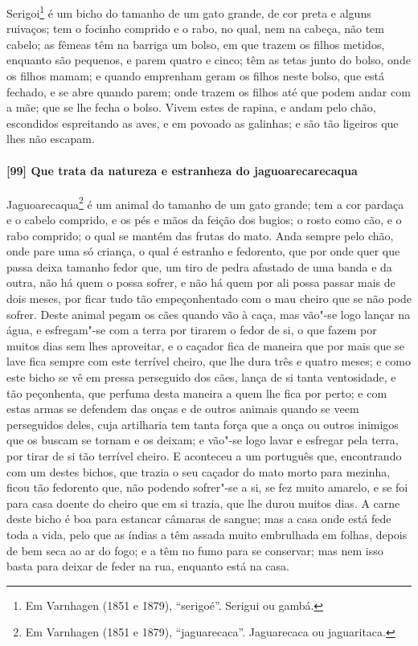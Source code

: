 Serigoi\footnote{ Em Varnhagen (1851 e 1879), ``serigoé''. Serigui ou gambá.} é um bicho
do tamanho de um gato grande, de cor preta e alguns ruivaços; tem o focinho comprido e o
rabo, no qual, nem na cabeça, não tem cabelo; as fêmeas têm na barriga um bolso, em que
trazem os filhos metidos, enquanto são pequenos, e parem quatro e cinco; têm as tetas
junto do bolso, onde os filhos mamam; e quando emprenham geram os filhos neste bolso, que
está fechado, e se abre quando parem; onde trazem os filhos até que podem andar com a mãe;
que se lhe fecha o bolso. Vivem estes de rapina, e andam pelo chão, escondidos espreitando
as aves, e em povoado as galinhas; e são tão ligeiros que lhes não escapam.

\paragraph{[99] Que trata da natureza e estranheza do jaguoarecarecaqua}\quad
Jaguoarecaqua\footnote{ Em Varnhagen (1851 e 1879), ``jaguarecaca''. Jaguarecaca ou
jaguaritaca.} é um animal do tamanho de um gato grande; tem a cor pardaça e o cabelo
comprido, e os pés e mãos da feição dos bugios; o rosto como cão, e o rabo comprido; o
qual se mantém das frutas do mato. Anda sempre pelo chão, onde pare uma só criança, o qual
é estranho e fedorento, que por onde quer que passa deixa tamanho fedor que, um tiro de
pedra afastado de uma banda e da outra, não há quem o possa sofrer, e não há quem por ali
possa passar mais de dois meses, por ficar tudo tão empeçonhentado com o mau cheiro que se
não pode sofrer. Deste animal pegam os cães quando vão à caça, mas vão"-se logo lançar na
água, e esfregam"-se com a terra por tirarem o fedor de si, o que fazem por muitos dias sem
lhes aproveitar, e o caçador fica de maneira que por mais que se lave fica sempre com este
terrível cheiro, que lhe dura três e quatro meses; e como este bicho se vê em pressa
perseguido dos cães, lança de si tanta ventosidade, e tão peçonhenta, que perfuma desta
maneira a quem lhe fica por perto; e com estas armas se defendem das onças e de outros
animais quando se veem perseguidos deles, cuja artilharia tem tanta força que a onça ou
outros inimigos que os buscam se tornam e os deixam; e vão"-se logo lavar e esfregar pela
terra, por tirar de si tão terrível cheiro. E aconteceu a um português que, encontrando
com um destes bichos, que trazia o seu caçador do mato morto para mezinha, ficou tão
fedorento que, não podendo sofrer"-se a si, se fez muito amarelo, e se foi para casa doente
do cheiro que em si trazia, que lhe durou muitos dias. A carne deste bicho é boa para
estancar câmaras de sangue; mas a casa onde está fede toda a vida, pelo que as índias a
têm assada muito embrulhada em folhas, depois de bem seca ao ar do fogo; e a têm no fumo
para se conservar; mas nem isso basta para deixar de feder na rua, enquanto está na casa.

